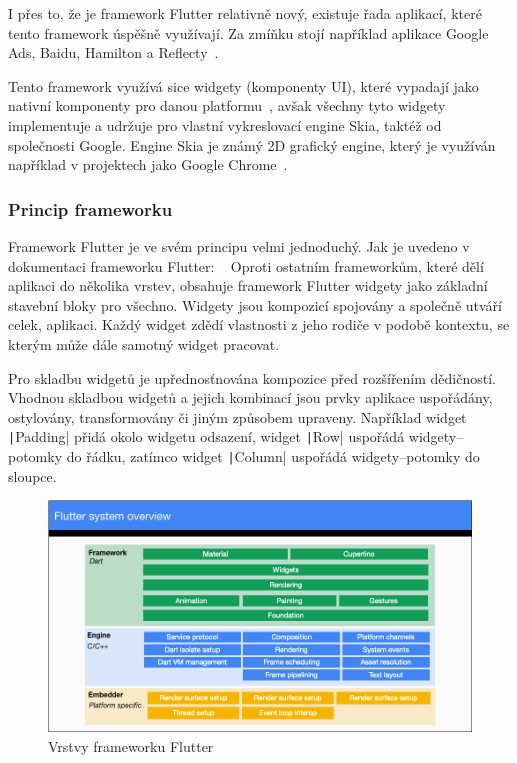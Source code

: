 I přes to,
že je framework Flutter relativně nový,
existuje řada aplikací,
které tento framework úspěšně využívají.
Za zmíňku stojí například aplikace Google Ads, Baidu, Hamilton a
Reflecty~\cite{flutter}.

Tento framework využívá sice widgety (komponenty UI),
které vypadají jako nativní komponenty pro danou platformu~\cite{flutter},
avšak všechny tyto widgety implementuje a udržuje pro vlastní vykreslovací
engine Skia,
taktéž od společnosti Google.
Engine Skia je známý 2D grafický engine,
který je využíván například v projektech jako Google Chrome~\cite{skia}.

\subsubsection*{Princip frameworku }

Framework Flutter je ve svém principu velmi jednoduchý.
Jak je uvedeno v dokumentaci frameworku Flutter:
~\cite{flutter_technical_overview}
Oproti ostatním frameworkům,
které dělí aplikaci do několika vrstev,
obsahuje framework Flutter widgety jako základní stavební bloky pro všechno.
Widgety jsou kompozicí spojovány a společně utváří celek, aplikaci.
Každý widget zdědí vlastnosti z jeho rodiče v podobě kontextu,
se kterým může dále samotný widget pracovat.
\cite{flutter_technical_overview}

Pro skladbu widgetů je upřednosťnována kompozice před rozšířením dědičností.
Vhodnou skladbou widgetů a jejich kombinací jsou prvky aplikace uspořádány,
ostylovány, transformovány či jiným způsobem upraveny.
Například widget \texttt|Padding| přidá okolo widgetu odsazení,
widget \texttt|Row| uspořádá widgety--potomky do řádku,
zatímco widget \texttt|Column| uspořádá widgety--potomky do sloupce.
\cite{flutter_technical_overview}

\begin{figure}[ht!]
    \centering
    \includegraphics[width=\linewidth]{assets/technology-research/framework/flutter_overview.png}
    \caption{Vrstvy frameworku Flutter ~\cite{flutter_technical_overview}}
    \label{fig:flutter_layers}
\end{figure}

